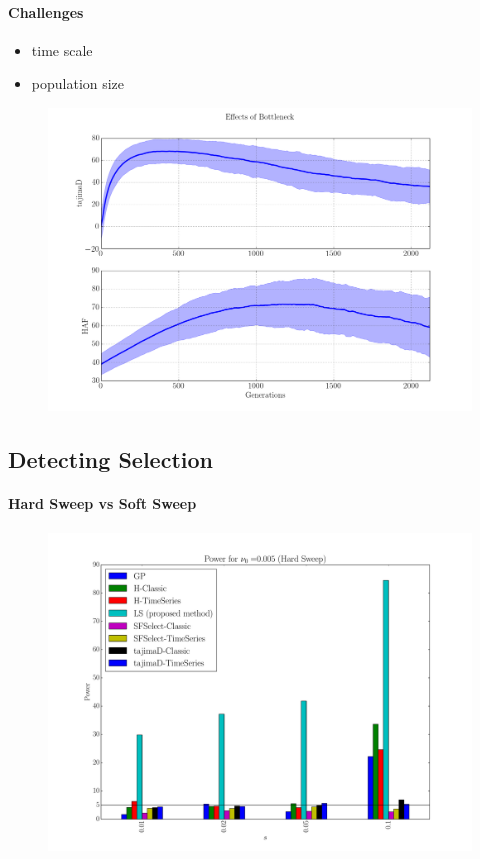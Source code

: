 \documentclass[11pt]{article}
\begin{document}
\begin{enumerate}[I.]
\paragraph{Challenges}
\begin{itemize}
	\item time scale
	\item population size
\end{itemize}
\begin{figure}
	\centering \label{fig:bottleneck}
	\includegraphics[scale=0.2]{bottleneck}
\end{figure}



\subsection{Detecting Selection}
\paragraph{Hard Sweep vs Soft Sweep}
\begin{figure}
	\centering
	\includegraphics[trim=2.2in 0 2.2in 0 , clip,width=\textwidth]{power}
\end{figure}


\end{enumerate}
\end{document}
